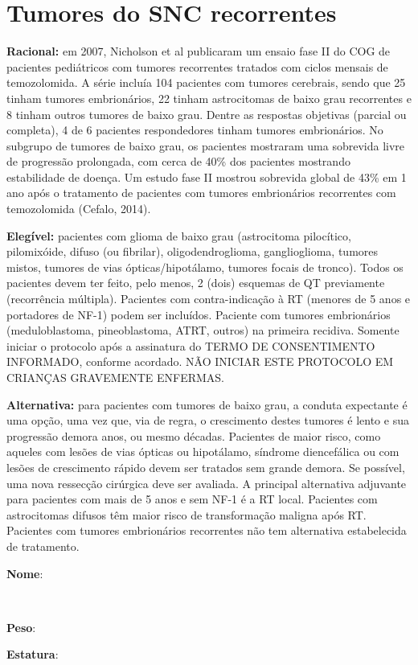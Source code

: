\documentclass[11pt,a4paper,oldfontcommands]{memoir}
\def\entrywithlabel[#1]#2{\parbox{#1}{{\small #2:} \hrulefill}}
\begin{document}
\section{Tumores do SNC recorrentes}
{\let\thefootnote\relax{}}
\textbf{Racional:} em 2007, Nicholson et al publicaram um ensaio fase II do COG de pacientes pediátricos com tumores recorrentes tratados com ciclos mensais de temozolomida. A série incluía 104 pacientes com tumores cerebrais, sendo que 25 tinham tumores embrionários, 22 tinham astrocitomas de baixo grau recorrentes e 8 tinham outros tumores de baixo grau. Dentre as respostas objetivas (parcial ou completa), 4 de 6 pacientes respondedores tinham tumores embrionários. No subgrupo de tumores de baixo grau, os pacientes mostraram uma sobrevida livre de progressão prolongada, com cerca de 40\% dos pacientes mostrando estabilidade de doença. Um estudo fase II mostrou sobrevida global de 43\% em 1 ano após o tratamento de pacientes com tumores embrionários recorrentes com temozolomida (Cefalo, 2014).

\textbf{Elegível:} pacientes com glioma de baixo grau (astrocitoma pilocítico, pilomixóide, difuso (ou fibrilar), oligodendroglioma, ganglioglioma, tumores mistos, tumores de vias ópticas/hipotálamo, tumores focais de tronco). Todos os pacientes devem ter feito, pelo menos, 2 (dois) esquemas de QT previamente (recorrência múltipla). Pacientes com contra-indicação à RT (menores de 5 anos e portadores de NF-1) podem ser incluídos. Paciente com tumores embrionários (meduloblastoma, pineoblastoma, ATRT, outros) na primeira recidiva. Somente iniciar o protocolo após a assinatura do TERMO DE CONSENTIMENTO INFORMADO, conforme acordado. NÃO INICIAR ESTE PROTOCOLO EM CRIANÇAS GRAVEMENTE ENFERMAS.

\textbf{Alternativa:} para pacientes com tumores de baixo grau, a conduta expectante é uma opção, uma vez que, via de regra, o crescimento destes tumores é lento e sua progressão demora anos, ou mesmo décadas. Pacientes de maior risco, como aqueles com lesões de vias ópticas ou hipotálamo, síndrome diencefálica ou com lesões de crescimento rápido devem ser tratados sem grande demora. Se possível, uma nova ressecção cirúrgica deve ser avaliada. A principal alternativa adjuvante para pacientes com mais de 5 anos e sem NF-1 é a RT local. Pacientes com astrocitomas difusos têm maior risco de transformação maligna após RT. Pacientes com tumores embrionários recorrentes não tem alternativa estabelecida de tratamento.
\\[0.4cm]
\entrywithlabel[1\hsize]{\textbf{Nome}}\hfill
\\[0.3cm]
\entrywithlabel[.45\hsize]{\textbf{Peso}}\hfill  \entrywithlabel[.45\hsize]{\textbf{Estatura}}
\end{document}
